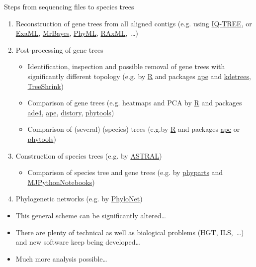 \documentclass[compress, ucs, xelatex, 11pt, xcolor=x11names, aspectratio=1609,
	hyperref={
		bookmarks=true,
		unicode=true,
		colorlinks=true,
		pdftitle={HybSeq course},
		plainpages=false,
		pdfauthor={Vojtech Zeisek},
		pdfsubject={Practical processing of HybSeq target enrichment sequencing data on computing grids like MetaCentrum},
		pdfcreator={XeLaTeX},
		pdfkeywords={BASH, command line, GNU, HybSeq, Linux, MetaCentrum, sequencing shell, target enrichment},
		linkcolor=Cyan2, %
		anchorcolor=Firebrick2, %
		citecolor=Firebrick2, %
		filecolor=Firebrick2, %
		menucolor=Firebrick2, %
		urlcolor=Chartreuse2, %
		pdftex},
	url={hyphens, lowtilde} %
	]{beamer}
\begin{document}
\begin{frame}[allowframebreaks]{Steps from sequencing files to species trees}
\begin{enumerate}
		\item Reconstruction of gene trees from all aligned contigs (e.g. using \href{http://www.iqtree.org/}{IQ-TREE}, or \href{https://github.com/stamatak/ExaML}{ExaML}, \href{https://nbisweden.github.io/MrBayes/}{MrBayes}, \href{http://www.atgc-montpellier.fr/phyml/}{PhyML}, \href{https://github.com/stamatak/standard-RAxML}{RAxML},~\ldots)
		\item Post-processing of gene trees
		\begin{itemize}
			\item Identification, inspection and possible removal of gene trees with significantly different topology (e.g. by \href{https://www.r-project.org/}{R} and packages \href{https://cran.r-project.org/package=ape}{ape} and \href{https://cran.r-project.org/package=kdetrees}{kdetrees}, \href{https://github.com/uym2/TreeShrink}{TreeShrink})
			\item Comparison of gene trees (e.g. heatmaps and PCA by \href{https://www.r-project.org/}{R} and packages \href{https://cran.r-project.org/package=ade4}{ade4}, \href{https://cran.r-project.org/package=ape}{ape}, \href{https://cran.r-project.org/package=distory}{distory}, \href{https://cran.r-project.org/package=phytools}{phytools})
			\item Comparison of (several) (species) trees (e.g.by \href{https://www.r-project.org/}{R} and packages \href{https://cran.r-project.org/package=ape}{ape} or \href{https://cran.r-project.org/package=phytools}{phytools})
		\end{itemize}
		\item Construction of species trees (e.g. by \href{https://github.com/smirarab/ASTRAL}{ASTRAL})
		\begin{itemize}
			\item Comparison of species tree and gene trees (e.g. by \href{https://bitbucket.org/blackrim/phyparts}{phyparts} and \href{https://github.com/mossmatters/MJPythonNotebooks}{MJPythonNotebooks})
		\end{itemize}
		\item Phylogenetic networks (e.g. by \href{https://bioinfocs.rice.edu/PhyloNet}{PhyloNet})
	\end{enumerate}
	\vfil
	\begin{itemize}
		\item This general scheme can be significantly altered\ldots
		\item There are plenty of technical as well as biological problems (HGT, ILS,~\ldots) and new software keep being developed\ldots
		\item Much more analysis possible\ldots
	\end{itemize}
\end{frame}
\end{document}
